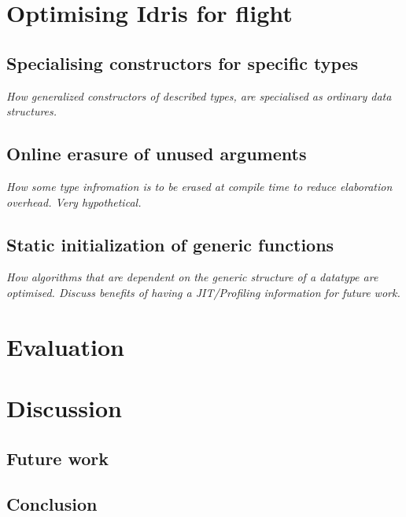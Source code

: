 \documentclass{ituthesis}
\begin{document}
\chapter{Optimising Idris for flight}
\label{cha:OptimizingIdrisforFlight}

\section{Specialising constructors for specific types}
\label{sec:SpecialisingConstructorsforSpecificTypes}
\textit{How generalized constructors of described types, are specialised as ordinary data structures.}

\section{Online erasure of unused arguments}
\label{sec:OnlineErasureofUnusedArguments}
\textit{How some type infromation is to be erased at compile time to reduce elaboration overhead. Very hypothetical.}

\section{Static initialization of generic functions}
\label{sec:StaticInitializationofGenericFunctions}
\textit{How algorithms that are dependent on the generic structure of a datatype are optimised. Discuss benefits of having a JIT/Profiling information for future work.}

\chapter{Evaluation}
\label{cha:Evaluation}

\chapter{Discussion}
\label{cha:Discussion}

\section{Future work}
\label{sec:FutureWork}

\section{Conclusion}
\label{sec:Conclusion}

\appendix

\end{document}
